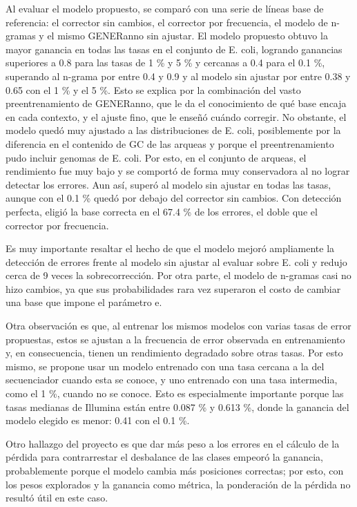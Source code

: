 \documentclass[sigconf,nonacm]{acmart}
\begin{document}
Al evaluar el modelo propuesto, se comparó con una serie de líneas base de referencia: el corrector sin cambios, el corrector por frecuencia, el modelo de n-gramas y el mismo GENERanno sin ajustar. El modelo propuesto obtuvo la mayor ganancia en todas las tasas en el conjunto de E. coli, logrando ganancias superiores a 0.8 para las tasas de 1 \% y 5 \% y cercanas a 0.4 para el 0.1 \%, superando al n-grama por entre 0.4 y 0.9 y al modelo sin ajustar por entre 0.38 y 0.65 con el 1 \% y el 5 \%. Esto se explica por la combinación del vasto preentrenamiento de GENERanno, que le da el conocimiento de qué base encaja en cada contexto, y el ajuste fino, que le enseñó cuándo corregir. No obstante, el modelo quedó muy ajustado a las distribuciones de E. coli, posiblemente por la diferencia en el contenido de GC de las arqueas y porque el preentrenamiento pudo incluir genomas de E. coli. Por esto, en el conjunto de arqueas, el rendimiento fue muy bajo y se comportó de forma muy conservadora al no lograr detectar los errores. Aun así, superó al modelo sin ajustar en todas las tasas, aunque con el 0.1 \% quedó por debajo del corrector sin cambios. Con detección perfecta, eligió la base correcta en el 67.4 \% de los errores, el doble que el corrector por frecuencia.

Es muy importante resaltar el hecho de que el modelo mejoró ampliamente la detección de errores frente al modelo sin ajustar al evaluar sobre E. coli y redujo cerca de 9 veces la sobrecorrección. Por otra parte, el modelo de n-gramas casi no hizo cambios, ya que sus probabilidades rara vez superaron el costo de cambiar una base que impone el parámetro e.

Otra observación es que, al entrenar los mismos modelos con varias tasas de error propuestas, estos se ajustan a la frecuencia de error observada en entrenamiento y, en consecuencia, tienen un rendimiento degradado sobre otras tasas. Por esto mismo, se propone usar un modelo entrenado con una tasa cercana a la del secuenciador cuando esta se conoce, y uno entrenado con una tasa intermedia, como el 1 \%, cuando no se conoce. Esto es especialmente importante porque las tasas medianas de Illumina están entre 0.087 \% y 0.613 \%, donde la ganancia del modelo elegido es menor: 0.41 con el 0.1 \%.

Otro hallazgo del proyecto es que dar más peso a los errores en el cálculo de la pérdida para contrarrestar el desbalance de las clases empeoró la ganancia, probablemente porque el modelo cambia más posiciones correctas; por esto, con los pesos explorados y la ganancia como métrica, la ponderación de la pérdida no resultó útil en este caso.
\end{document}
